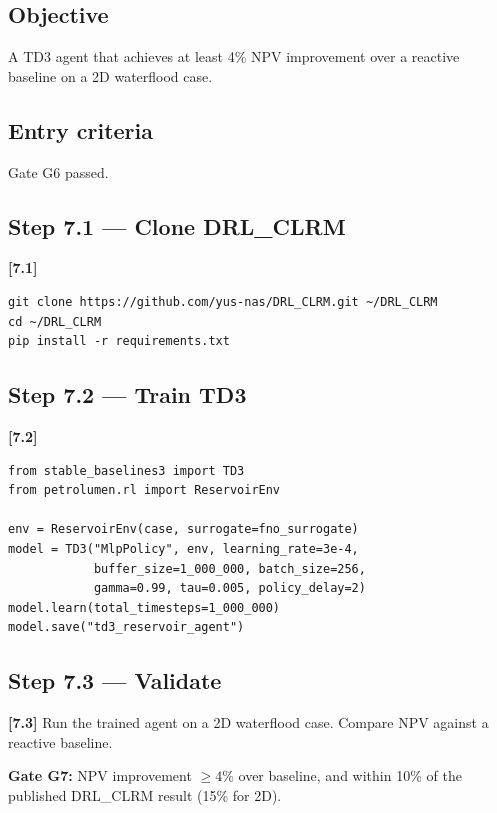 \documentclass[10pt,a4paper]{article}
\newcommand{\stepID}[1]{\textsf{\textbf{[#1]}}}
\begin{document}
\subsection{Objective}
A TD3 agent that achieves at least 4\% NPV improvement over a reactive baseline on a 2D waterflood case.

\subsection{Entry criteria}
Gate G6 passed.

\subsection{Step 7.1 --- Clone DRL\_CLRM}

\stepID{7.1}
\begin{lstlisting}[style=sh]
git clone https://github.com/yus-nas/DRL_CLRM.git ~/DRL_CLRM
cd ~/DRL_CLRM
pip install -r requirements.txt
\end{lstlisting}

\subsection{Step 7.2 --- Train TD3}

\stepID{7.2}
\begin{lstlisting}
from stable_baselines3 import TD3
from petrolumen.rl import ReservoirEnv

env = ReservoirEnv(case, surrogate=fno_surrogate)
model = TD3("MlpPolicy", env, learning_rate=3e-4,
            buffer_size=1_000_000, batch_size=256,
            gamma=0.99, tau=0.005, policy_delay=2)
model.learn(total_timesteps=1_000_000)
model.save("td3_reservoir_agent")
\end{lstlisting}

\subsection{Step 7.3 --- Validate}

\stepID{7.3} Run the trained agent on a 2D waterflood case. Compare NPV against a reactive baseline.

\begin{gate}
\textbf{Gate G7:} NPV improvement $\geq 4\%$ over baseline, and within 10\% of the published DRL\_CLRM result (15\% for 2D).
\end{gate}

\end{document}
